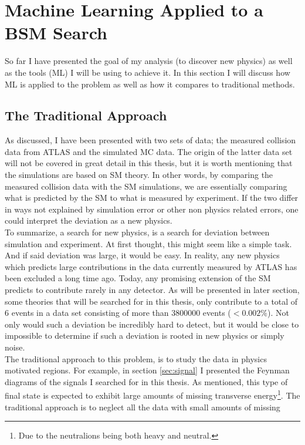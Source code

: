 \section{Machine Learning Applied to a BSM Search}\label{sec:MLHEP}
So far I have presented the goal of my analysis (to discover new physics)
as well as the tools (\ac{ML}) I will be using to achieve it. In this section
I will discuss how \ac{ML} is applied to the problem as well as how it compares
to traditional methods.
\subsection{The Traditional Approach}
As discussed, I have been presented with two sets of data; the measured collision 
data from \ac{ATLAS} and the simulated \ac{MC} data. The origin of the latter data set 
will not be covered in great detail in this thesis, but it is worth mentioning that 
the simulations are based on \ac{SM} theory. In other words, by comparing the measured collision 
data with the \ac{SM} simulations, we are essentially comparing what is predicted by the \ac{SM} 
to what is measured by experiment. If the two differ in ways not explained by simulation error 
or other non physics related errors, one could interpret the deviation as a new physics.
\\
To summarize, a search for new physics, is a search for deviation between simulation and 
experiment. At first thought, this might seem like a simple task. And if said deviation 
was large, it would be easy. In reality, any new physics which predicts large contributions 
in the data currently measured by \ac{ATLAS} has been excluded a long time ago. Today, any
promising extension of the \ac{SM} predicts to contribute rarely in any detector. As will 
be presented in later section, some theories that will be searched for in this thesis, only 
contribute to a total of 6 events in a data set consisting of more than $3800000$ events 
($<0.002\%$). Not only would such a deviation be incredibly hard to detect, but it would 
be close to impossible to determine if such a deviation is rooted in new physics or simply 
noise. 
\\
The traditional approach to this problem, is to study the data in physics motivated regions. 
For example, in section \ref{sec:signal} I presented the Feynman diagrams of the signals I 
searched for in this thesis. As mentioned, this type of final state is expected to exhibit 
large amounts of missing transverse energy\footnote{Due to the neutralions being both heavy 
and neutral.}. The traditional approach is to neglect all the data with small amounts of missing 
